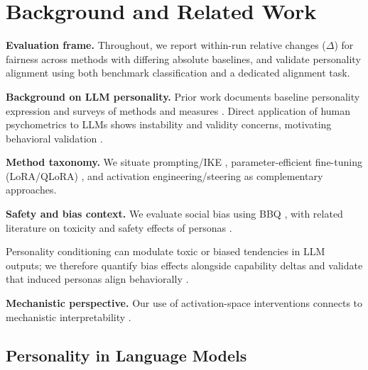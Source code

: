 \section{Background and Related Work}
\label{app:background}
\noindent\textbf{Evaluation frame.} Throughout, we report within-run relative changes (\(\Delta\)) for fairness across methods with differing absolute baselines, and validate personality alignment using both benchmark classification and a dedicated alignment task.

\noindent\textbf{Background on LLM personality.} Prior work documents baseline personality expression and surveys of methods and measures \citep{serapio-garcia-etal-2023-personality-traits-llms,jiang-2024-personallm-naacl,wen-2024-llm-personality-survey}. Direct application of human psychometrics to LLMs shows instability and validity concerns, motivating behavioral validation \citep{gupta-2024-psychometric-validity-llms,song-2023-stability-llm-personality}.

\noindent\textbf{Method taxonomy.} We situate prompting/IKE \citep{mao-2023-editing-personality}, parameter-efficient fine-tuning (LoRA/QLoRA) \citep{hu-etal-2022-lora,dettmers-2023-qlora}, and activation engineering/steering \citep{turner-etal-2023-activation-steering,panickssery-2024-contrastive-activation-addition,chen-2025-persona-vectors} as complementary approaches.

\noindent\textbf{Safety and bias context.} We evaluate social bias using BBQ \citep{parrish-etal-2022-bbq}, with related literature on toxicity and safety effects of personas \citep{gehman-2020-realtoxicityprompts,zhang-2024-better-angels,wang-2025-personality-bias-toxicity,durmus-2024-evaluating-feature-steering}.

Personality conditioning can modulate toxic or biased tendencies in LLM outputs; we therefore quantify bias effects alongside capability deltas and validate that induced personas align behaviorally \citep{gehman-2020-realtoxicityprompts,wang-2025-personality-bias-toxicity}.

\noindent\textbf{Mechanistic perspective.} Our use of activation-space interventions connects to mechanistic interpretability \citep{olah-2020-circuits,bricken-2023-monosemanticity,elhage-2022-superposition,rai-2024-mechinterp-review}.

\subsection{Personality in Language Models}

